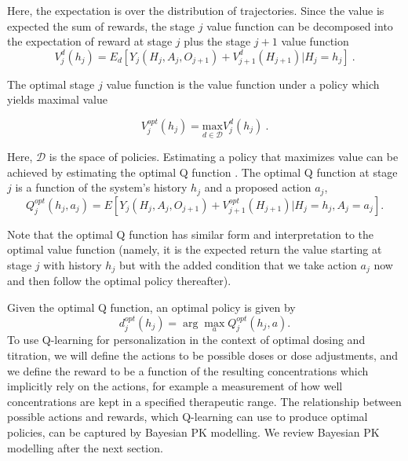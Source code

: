 \noindent Here, the expectation is over the distribution of trajectories. Since the value is expected the sum of rewards, the stage $ j $ 
value function can be decomposed into the expectation of reward at stage $ j $ plus the stage $ j+1  $ value function  \cite{chakraborty2013statistical}
\begin{equation}
V^d_j(h_j) = E_d\left[Y_j(H_j, A_j, O_{j+1}) + V^d_{j+1}(H_{j+1}) \vert H_j = h_j\right] \>.
\end{equation}


\noindent The optimal stage $ j  $ value function is the value function under a policy which yields maximal value

\begin{equation}
V^{opt}_j(h_j) = \underset{d \in \mathcal{D}}{\mbox{max}} V^d_j(h_j) \>.
\end{equation}

\noindent  Here, $\mathcal{D}$ is the space of policies.  Estimating a policy that maximizes value can be achieved by estimating the optimal Q function \cite{chakraborty2013statistical}.  The optimal Q function at stage $ j $ is a function of the system’s history $ h_j $ and a proposed action $ a_j $,
\begin{equation}
 Q_j^{opt}(h_j, a_j) = E \left[ 
 Y_j(H_j, A_j, O_{j+1}) + V^{opt}_{j+1}(H_{j+1}) \lvert H_j = h_j, A_j = a_j
 \right].
\end{equation}

\noindent Note that the optimal Q function has similar form and interpretation to the optimal value function (namely, it is the expected return \textemdash the value \textemdash starting at stage $ j $ with history $h_j$ but with the added condition that we take action $ a_j $ now and then follow the optimal policy thereafter). 

Given the optimal Q function, an optimal policy is given by 
\begin{equation}
d_j^{opt}(h_j) = \arg\max_{a} Q_j^{opt}(h_j,a).
\end{equation}
To use Q-learning for personalization in the context of optimal dosing and titration, we will define the actions to be possible doses or dose adjustments, and we define the reward to be a function of the resulting concentrations which implicitly rely on the actions, for example a measurement of how well concentrations are kept in a specified therapeutic range. The relationship between possible actions and rewards, which Q-learning can use to produce optimal policies, can be captured by Bayesian PK modelling. We review Bayesian PK modelling after the next section.

